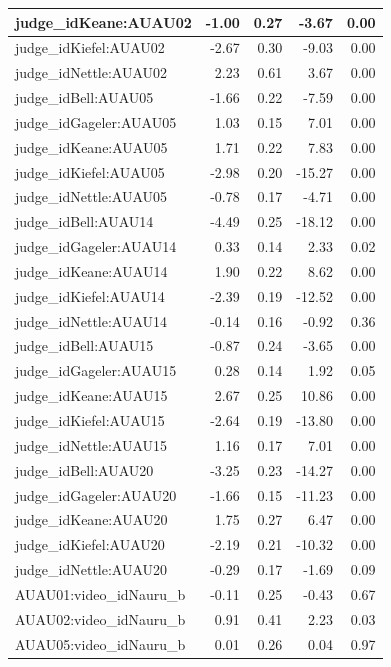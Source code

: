 \documentclass{monashthesis}
\begin{document}
\begin{tabular}{l|r|r|r|r}
\hline
judge\_idKeane:AUAU02 & -1.00 & 0.27 & -3.67 & 0.00\\
\hline
judge\_idKiefel:AUAU02 & -2.67 & 0.30 & -9.03 & 0.00\\
\hline
judge\_idNettle:AUAU02 & 2.23 & 0.61 & 3.67 & 0.00\\
\hline
judge\_idBell:AUAU05 & -1.66 & 0.22 & -7.59 & 0.00\\
\hline
judge\_idGageler:AUAU05 & 1.03 & 0.15 & 7.01 & 0.00\\
\hline
judge\_idKeane:AUAU05 & 1.71 & 0.22 & 7.83 & 0.00\\
\hline
judge\_idKiefel:AUAU05 & -2.98 & 0.20 & -15.27 & 0.00\\
\hline
judge\_idNettle:AUAU05 & -0.78 & 0.17 & -4.71 & 0.00\\
\hline
judge\_idBell:AUAU14 & -4.49 & 0.25 & -18.12 & 0.00\\
\hline
judge\_idGageler:AUAU14 & 0.33 & 0.14 & 2.33 & 0.02\\
\hline
judge\_idKeane:AUAU14 & 1.90 & 0.22 & 8.62 & 0.00\\
\hline
judge\_idKiefel:AUAU14 & -2.39 & 0.19 & -12.52 & 0.00\\
\hline
judge\_idNettle:AUAU14 & -0.14 & 0.16 & -0.92 & 0.36\\
\hline
judge\_idBell:AUAU15 & -0.87 & 0.24 & -3.65 & 0.00\\
\hline
judge\_idGageler:AUAU15 & 0.28 & 0.14 & 1.92 & 0.05\\
\hline
judge\_idKeane:AUAU15 & 2.67 & 0.25 & 10.86 & 0.00\\
\hline
judge\_idKiefel:AUAU15 & -2.64 & 0.19 & -13.80 & 0.00\\
\hline
judge\_idNettle:AUAU15 & 1.16 & 0.17 & 7.01 & 0.00\\
\hline
judge\_idBell:AUAU20 & -3.25 & 0.23 & -14.27 & 0.00\\
\hline
judge\_idGageler:AUAU20 & -1.66 & 0.15 & -11.23 & 0.00\\
\hline
judge\_idKeane:AUAU20 & 1.75 & 0.27 & 6.47 & 0.00\\
\hline
judge\_idKiefel:AUAU20 & -2.19 & 0.21 & -10.32 & 0.00\\
\hline
judge\_idNettle:AUAU20 & -0.29 & 0.17 & -1.69 & 0.09\\
\hline
AUAU01:video\_idNauru\_b & -0.11 & 0.25 & -0.43 & 0.67\\
\hline
AUAU02:video\_idNauru\_b & 0.91 & 0.41 & 2.23 & 0.03\\
\hline
AUAU05:video\_idNauru\_b & 0.01 & 0.26 & 0.04 & 0.97\\

\end{tabular}
\end{document}
